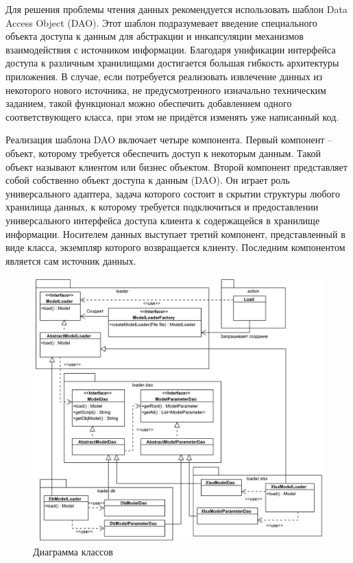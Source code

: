 \documentclass[14pt,oneside,final]{extreport}
\begin{document}
	Для решения проблемы чтения данных рекомендуется \cite{web:J2EEPatterns} использовать шаблон Data Access Object (DAO). Этот шаблон подразумевает  введение специального объекта доступа к данным для абстракции и инкапсуляции механизмов взаимодействия с источником информации. Благодаря унификации интерфейса доступа к различным хранилищами достигается большая гибкость архитектуры приложения. В случае, если потребуется реализовать извлечение данных из некоторого нового источника, не предусмотренного изначально техническим заданием, такой функционал можно обеспечить добавлением одного соответствующего класса, при этом не придётся изменять уже написанный код.   
	
	Реализация шаблона DAO включает  четыре компонента. Первый компонент -- объект, которому требуется обеспечить доступ к некоторым данным. Такой объект называют клиентом или бизнес объектом. Второй компонент представляет собой собственно объект доступа к данным (DAO). Он играет роль универсального адаптера, задача которого состоит в скрытии структуры любого хранилища данных, к которому требуется подключиться и предоставлении универсального интерфейса доступа клиента к содержащейся в хранилище информации. Носителем данных выступает третий компонент, представленный в виде класса, экземпляр которого возвращается клиенту. Последним компонентом является  сам источник данных.  
	
	\begin{figure}[!h]
		\begin{center}
			\includegraphics[scale=0.15]{img/class-diagram} 
		\end{center}
		\caption{Диаграмма классов}
		\label{fig:class-diagram}
	\end{figure}
	
\end{document}
